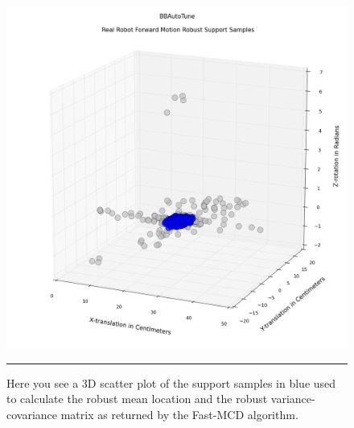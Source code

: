 
\begin{figure}[htbp]
\centering
\includegraphics[scale=0.5]{../Figures/Chapter4/real_robot_robust_samples.png}
\rule{35em}{0.5pt}
\caption[Real Robot Forward Motion Fast-MCD Support Samples]{Here you see a 3D scatter plot of the support samples in blue used to calculate the robust mean location and the robust variance-covariance matrix as returned by the Fast-MCD algorithm.}
\label{fig:robust_support_samples}
\end{figure}

